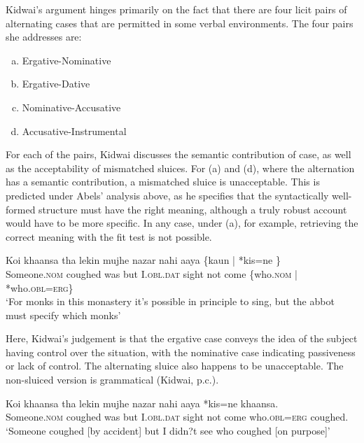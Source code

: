 \documentclass{turabian-researchpaper}
\begin{document}
Kidwai's argument hinges primarily on the fact that there are four licit pairs of alternating cases that are permitted in some verbal environments.  The four pairs she addresses are:

\begin{enumerate}[(a)]
\item Ergative-Nominative 
\item Ergative-Dative
\item Nominative-Accusative
\item Accusative-Instrumental
\end{enumerate}
For each of the pairs, Kidwai discusses the semantic contribution of case, as well as the acceptability of mismatched sluices. For (a) and (d), where the alternation has a semantic contribution, a mismatched sluice is unacceptable. This is predicted under Abels' analysis above, as he specifies that the syntactically well-formed structure must have the right meaning, although a truly robust account would have to be more specific. In any case, under (a), for example, retrieving the correct meaning with the fit test is not possible. 

\begin{exe}
\ex\label{someonecoughed1}
\gll Koi khaansa tha lekin mujhe nazar nahi aaya \{kaun | *kis=ne \}\\
Someone.\textsc{nom} coughed was but   I.\textsc{obl}.\textsc{dat} sight not come \{who.\textsc{nom} | *who.\textsc{obl}=\textsc{erg}\}
\\
\trans `For monks in this monastery it's possible in principle to sing, but the abbot must specify 
which monks'
\end{exe}

Here, Kidwai's judgement is that the ergative case conveys the idea of the subject having control over the situation, with the nominative case indicating passiveness or lack of control. The alternating sluice also happens to be unacceptable. The non-sluiced version is grammatical (Kidwai, p.c.).

\begin{exe}
\ex\label{someonecoughed2}
\gll Koi khaansa tha lekin mujhe nazar nahi aaya *kis=ne khaansa. \\
Someone.\textsc{nom} coughed was but   I.\textsc{obl}.\textsc{dat} sight not come who.\textsc{obl}=\textsc{erg} coughed. \\
\trans `Someone coughed [by accident] but I didn?t see who coughed [on purpose]' 
\end{exe}
\end{document}
